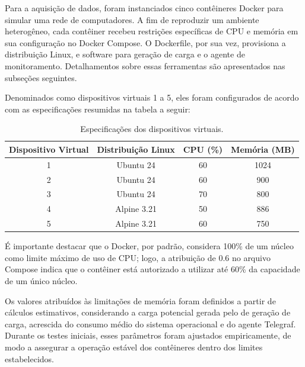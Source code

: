 Para a aquisição de dados, foram instanciados cinco contêineres Docker para simular uma rede de computadores. A fim de reproduzir um ambiente heterogêneo, cada contêiner recebeu restrições específicas de CPU e memória em sua configuração no Docker Compose. O Dockerfile, por sua vez, provisiona a distribuição Linux,  e software para geração de carga e o agente de monitoramento. Detalhamentos sobre essas ferramentas são apresentados nas subseções seguintes.

Denominados como dispositivos virtuais 1 a 5, eles foram configurados de acordo com as especificações resumidas na tabela a seguir:

\begin{table}[h]
\centering
\caption{Especificações dos dispositivos virtuais.}
\label{tab:EspecificaçõesDispositivosVirtuais}
\begin{tabular}{c c c c}
\hline
\textbf{Dispositivo Virtual} & \textbf{Distribuição Linux} & \textbf{CPU (\%)} & \textbf{Memória (MB)} \\
\hline
1 & Ubuntu 24 & 60 & 1024 \\
2 & Ubuntu 24 & 60 & 900 \\
3 & Ubuntu 24 & 70 & 800 \\
4 & Alpine 3.21 & 50 & 886 \\
5 & Alpine 3.21 & 60 & 750 \\
\hline
\end{tabular}
\end{table}

É importante destacar que o Docker, por padrão, considera 100\% de um núcleo como limite máximo de uso de CPU; logo, a atribuição de 0.6 no arquivo Compose indica que o contêiner está autorizado a utilizar até 60\% da capacidade de um único núcleo.

{\color{red}
Os valores atribuídos às limitações de memória foram definidos a partir de cálculos estimativos, considerando a carga potencial gerada pelo  de geração de carga, acrescida do consumo médio do sistema operacional e do agente Telegraf. Durante os testes iniciais, esses parâmetros foram ajustados empiricamente, de modo a assegurar a operação estável dos contêineres dentro dos limites estabelecidos.%
}


